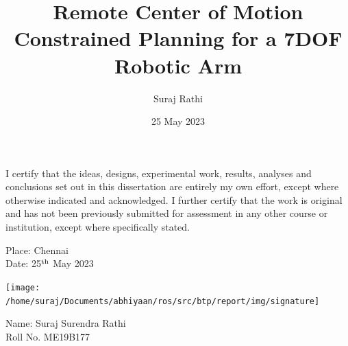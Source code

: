 \documentclass[BTech]{iitmdiss}
\begin{document}
    \newcommand{\titleText}{Remote Center of Motion Constrained Planning for a 7DOF Robotic Arm}
    \newcommand{\authorText}{Suraj Rathi}
    \title{\titleText}

    \author{\authorText}

    \date{25 May 2023}

    \maketitle

    \declaration

    \vspace*{0.5in}

    \noindent I certify that the ideas, designs, experimental work, results, analyses and conclusions set out in this
    dissertation are entirely my own effort, except where otherwise indicated and acknowledged.
    I further certify that the work is original and has not been previously submitted for assessment in
    any other course or institution, except where specifically stated.

    \vspace*{0.5in}


    \begin{paracol}{2}
            \vspace*{1.0in}
        \begin{singlespacing}
            \hspace*{-0.25in}
            \parbox{2.5in}{
                \noindent Place: Chennai\\
                Date: 25$^{\textnormal{th}}$ May 2023
            }
        \end{singlespacing}

        \switchcolumn
        \begin{singlespacing}
            \texttt{[image: /home/suraj/Documents/abhiyaan/ros/src/btp/report/img/signature]}


            \hspace*{-0.25in}
            \parbox{2.5in}{
                \noindent Name: Suraj Surendra Rathi \\
                \noindent Roll No. ME19B177
            }


        \end{singlespacing}

    \end{paracol}
\end{document}
